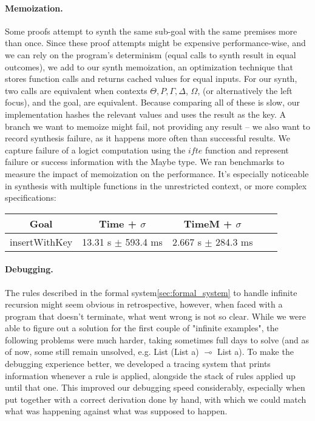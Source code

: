 \documentclass{llncs}
\newcommand{\lolli}{\multimap}
\newcommand{\mypara}[1]{\paragraph{\textbf{#1}.}}
\def\Rho{P}
\begin{document}
\mypara{Memoization} Some proofs attempt to synth the same sub-goal with the
same premises more than once. Since these proof attempts might be expensive
performance-wise, and we can rely on the program's determinism (equal calls to
synth result in equal outcomes), we add to our synth memoization, an
optimization technique that stores function calls and returns cached values for
equal inputs. For our synth, two calls are equivalent when contexts $\Theta,
\Rho, \Gamma, \Delta$, $\Omega$, (or alternatively the left focus), and the
goal, are equivalent. Because comparing all of these is slow, our implementation
hashes the relevant values and uses the result as the key. A
branch we want to memoize might fail, not providing any result -- we also want
to record synthesis failure, as it happens more often than successful results. We capture failure
of a logict computation using the $ifte$ function and represent failure or
success information with the Maybe type. We ran benchmarks to measure the impact
of memoization on the performance. It's especially noticeable in synthesis with
multiple functions in the unrestricted context, or more complex
specifications:
%
\begin{center}
    \begin{tabular}{ |c|c|c|c|c| }
        \hline
        Goal & Time + $\sigma$ & TimeM + $\sigma$ \\
        \hline
        insertWithKey & 13.31 s $\pm$ 593.4 ms & 2.667 s $\pm$ 284.3 ms \\
        \hline
    \end{tabular}
\end{center}



\mypara{Debugging} The rules described in the formal
system\ref{sec:formal_system} to handle infinite recursion might seem obvious in
retrospective, however, when faced with a program that doesn't terminate, what
went wrong is not so clear. While we were able to figure out a solution for the
first couple of "infinite examples", the following problems were much harder,
taking sometimes full days to solve (and as of now, some still remain unsolved,
e.g. List (List a) $\lolli$ List a). To make the debugging experience better, we
developed a tracing system that prints information whenever a rule is applied,
alongside the stack of rules applied up until that one. This improved our
debugging speed considerably, especially when put together with a correct
derivation done by hand, with which we could match what was happening against
what was supposed to happen.
\end{document}
